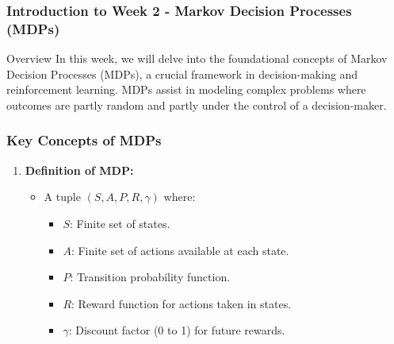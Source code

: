 \documentclass[aspectratio=169]{beamer}
\begin{document}
\frame{\titlepage}

\begin{frame}[fragile]
    \frametitle{Introduction to Week 2 - Markov Decision Processes (MDPs)}
    \begin{block}{Overview}
        In this week, we will delve into the foundational concepts of Markov Decision Processes (MDPs), a crucial framework in decision-making and reinforcement learning. MDPs assist in modeling complex problems where outcomes are partly random and partly under the control of a decision-maker.
    \end{block}
\end{frame}

\begin{frame}[fragile]
    \frametitle{Key Concepts of MDPs}
    \begin{enumerate}
        \item \textbf{Definition of MDP:}
        \begin{itemize}
            \item A tuple $(S, A, P, R, \gamma)$ where:
            \begin{itemize}
                \item $S$: Finite set of states.
                \item $A$: Finite set of actions available at each state.
                \item $P$: Transition probability function.
                \item $R$: Reward function for actions taken in states.
                \item $\gamma$: Discount factor (0 to 1) for future rewards.
            \end{itemize}
        \end{itemize}
    \end{enumerate}
\end{frame}
\end{document}
